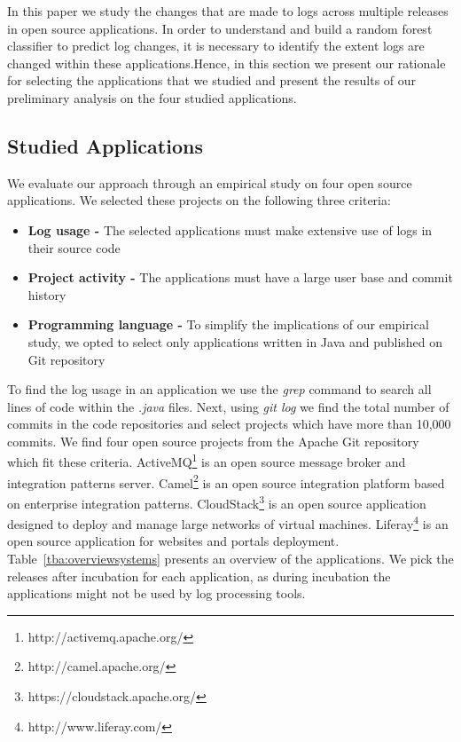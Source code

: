 In this paper we study the changes that are made to logs across multiple releases in open source applications. In order to understand and build a random forest classifier to predict log changes, it is necessary to identify the extent logs are changed within these applications.Hence, in this section we present our rationale for selecting the applications that we studied and present the results of our preliminary analysis on the four studied applications. 

\subsection{Studied Applications}
We evaluate our approach through an empirical study on four open source applications. We selected these projects on the following three criteria:
\begin{itemize}
	\item \textbf{Log usage -} The selected applications must make extensive use of logs in their source code
	\item \textbf{Project activity -} The applications must have a large user base and commit history
	\item \textbf{Programming language -} To simplify the implications of our empirical study, we opted to select only applications written in Java and published on Git repository
\end{itemize}




To find the log usage in an application we use the \emph{grep} command to search all lines of code within the \emph{.java} files. Next, using \emph{git log} we find the total number of commits in the code repositories and select projects which have more than 10,000 commits. We find four open source projects from the Apache Git repository which fit these criteria. ActiveMQ\footnote[1]{http://activemq.apache.org/} is an open source message broker and integration patterns server. {Camel}\footnote[2]{http://camel.apache.org/} is an open source integration platform based on enterprise integration patterns. {CloudStack}\footnote[3]{https://cloudstack.apache.org/} is an open source application designed to deploy and manage large networks of virtual machines. {Liferay}\footnote[4]{http://www.liferay.com/} is an open source application for websites and portals deployment. Table~\ref{tba:overviewsystems} presents an overview of the applications. We pick the releases after incubation for each application, as during incubation the applications might not be used by log processing tools.  


